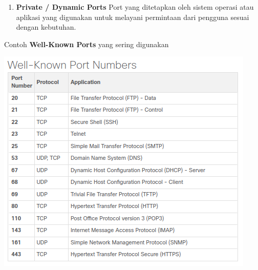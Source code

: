\documentclass{article}
\begin{document}
\begin{flushleft}
\begin{enumerate}
            \item \textbf{Private / Dynamic Ports}
            Port yang ditetapkan oleh sistem operasi atau aplikasi yang digunakan untuk melayani permintaan dari pengguna sesuai dengan kebutuhan.
        \end{enumerate}

        Contoh \textbf{Well-Known Ports} yang sering digunakan
        \begin{center}
            \includegraphics[scale=0.55]{1-3.png}
        \end{center}
    \end{flushleft}
\end{document}
